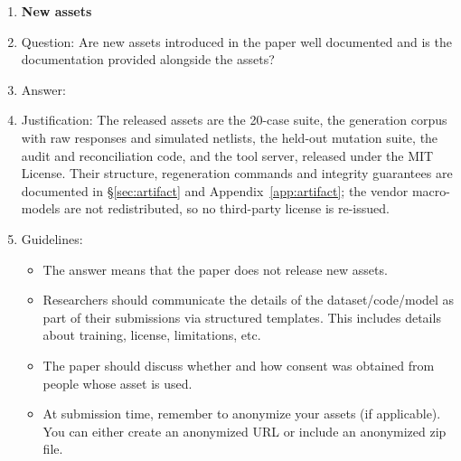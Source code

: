 \begin{enumerate}
\item {\bf New assets}
    \item[] Question: Are new assets introduced in the paper well documented and is the documentation provided alongside the assets?
        \item[] Answer: \answerYes{}
    \item[] Justification: The released assets are the 20-case suite, the
    generation corpus with raw responses and simulated netlists, the held-out
    mutation suite, the audit and reconciliation code, and the tool server,
    released under the MIT License. Their structure, regeneration commands and
    integrity guarantees are documented in \S\ref{sec:artifact} and
    Appendix~\ref{app:artifact}; the vendor macro-models are not
    redistributed, so no third-party license is re-issued.
    \item[] Guidelines:
    \begin{itemize}
        \item The answer \answerNA{} means that the paper does not release new assets.
        \item Researchers should communicate the details of the dataset\slash code\slash model as part of their submissions via structured templates. This includes details about training, license, limitations, etc. 
        \item The paper should discuss whether and how consent was obtained from people whose asset is used.
        \item At submission time, remember to anonymize your assets (if applicable). You can either create an anonymized URL or include an anonymized zip file.
    \end{itemize}


\end{enumerate}
